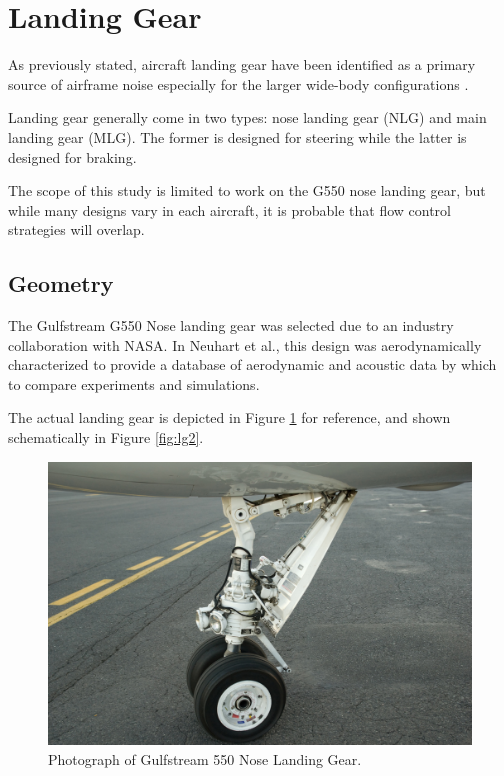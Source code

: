 \section{Landing Gear}
As previously stated, aircraft landing gear have been identified as a primary source of airframe noise especially for the larger wide-body configurations \cite{}. 

Landing gear generally come in two types: nose landing gear (NLG) and main landing gear (MLG). The former is designed for steering while the latter is designed for braking. 

The scope of this study is limited to work on the G550 nose landing gear, but while many designs vary in each aircraft, it is probable that flow control strategies will overlap. 

\subsection{Geometry}

The Gulfstream G550 Nose landing gear was selected due to an industry collaboration with NASA. In Neuhart et al., this design was aerodynamically characterized to provide a database of aerodynamic and acoustic data by which to compare experiments and simulations. 

The actual landing gear is depicted in Figure \ref{fig:lg1} for reference, and shown schematically in Figure \ref{fig:lg2}.



\begin{figure}
	\begin{center}
		\centerline{\includegraphics[scale=0.4]{figures/g550_nlg.pdf}}
		\caption{Photograph of Gulfstream 550 Nose Landing Gear.}
		\label{fig:lg1}
	\end{center}
\end{figure}

